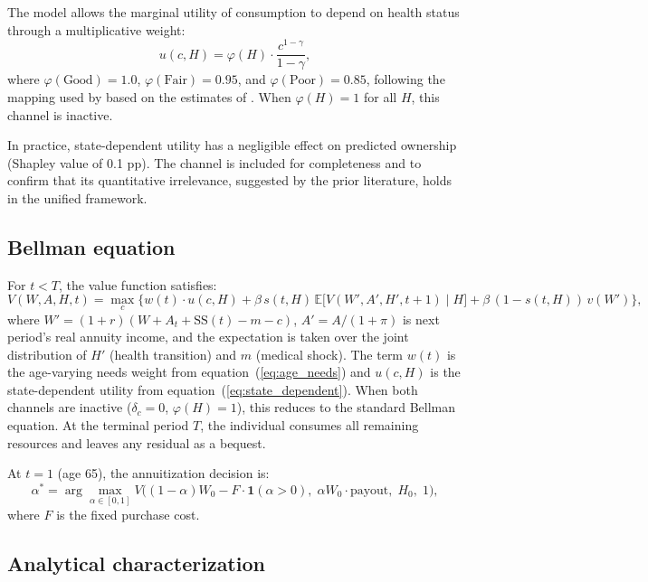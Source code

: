 \documentclass[12pt]{article}
\begin{document}
The model allows the marginal utility of consumption to depend on health status through a multiplicative weight:
\begin{equation}
\label{eq:state_dependent}
u(c, H) = \varphi(H) \cdot \frac{c^{1-\gamma}}{1-\gamma},
\end{equation}
where $\varphi(\text{Good}) = 1.0$, $\varphi(\text{Fair}) = 0.95$, and $\varphi(\text{Poor}) = 0.85$, following the mapping used by \citet{reichlingsmetters2015} based on the estimates of \citet{finkelsteinluttmer2013}. When $\varphi(H) = 1$ for all $H$, this channel is inactive.

In practice, state-dependent utility has a negligible effect on predicted ownership (Shapley value of 0.1 pp). The channel is included for completeness and to confirm that its quantitative irrelevance, suggested by the prior literature, holds in the unified framework.

\subsection{Bellman equation}

For $t < T$, the value function satisfies:
\begin{equation}
\label{eq:bellman}
V(W, A, H, t) = \max_{c} \Big\{ w(t) \cdot u(c, H) + \beta \, s(t, H) \, \mathbb{E}\big[V(W', A', H', t+1) \mid H\big] + \beta \, (1 - s(t, H)) \, v(W') \Big\},
\end{equation}
where $W' = (1+r)(W + A_t + \text{SS}(t) - m - c)$, $A' = A/(1+\pi)$ is next period's real annuity income, and the expectation is taken over the joint distribution of $H'$ (health transition) and $m$ (medical shock). The term $w(t)$ is the age-varying needs weight from equation~(\ref{eq:age_needs}) and $u(c, H)$ is the state-dependent utility from equation~(\ref{eq:state_dependent}). When both channels are inactive ($\delta_c = 0$, $\varphi(H) = 1$), this reduces to the standard Bellman equation. At the terminal period $T$, the individual consumes all remaining resources and leaves any residual as a bequest.

At $t = 1$ (age 65), the annuitization decision is:
\begin{equation}
\label{eq:annuitize}
\alpha^* = \arg\max_{\alpha \in [0,1]} V\big((1-\alpha) W_0 - F \cdot \mathbf{1}(\alpha > 0), \; \alpha W_0 \cdot \text{payout}, \; H_0, \; 1\big),
\end{equation}
where $F$ is the fixed purchase cost.

\subsection{Analytical characterization}
\label{sec:sufficient_stats}
\end{document}
